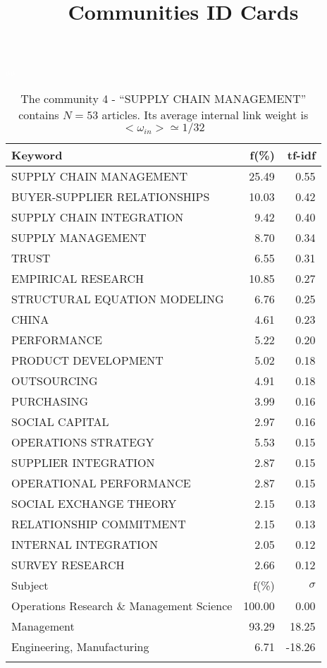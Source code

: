 \documentclass[a4paper,11pt]{report}
\title{{\bf Communities ID Cards}}
\date{\begin{flushleft}This document gather the ``ID Cards'' of the CC communities found within your database.\\
 The CC network was built by keeping a link between articles sharing at least 5 references. The communities characterized here correspond to the ones found in the level 1 (in the sense of the Louvain algo) which gathers more than 0 articles.\\
 These ID cards displays the most frequent keywords, subject categories, journals of publication, institution, countries, authors, references and reference journals of the articles of each community. The significance of an item $\sigma = \sqrt{N} (f - p) / \sqrt{p(1-p)}$ [where $N$ is the number of articles within the community and $f$ and $p$ are the proportion of articles respectively within the community and within the database displaying that item ] is also given (for example $\sigma > 5$ is really highly significant). The tf-idf value which can be calculated by $tf-idf = f*log(frac{1}{p})$ is also given.\\
\vspace{1cm}
\copyright Sebastian Grauwin, Liu Weizhi - (2014) \end{flushleft}}
\begin{document}
\begin{landscape}
\maketitle
\clearpage

\begin{table}[!ht]
\caption{The community 4 - ``SUPPLY CHAIN MANAGEMENT'' contains $N = 53$ articles. Its average internal link weight is $<\omega_{in}> \simeq 1/32$ }
\textcolor{white}{aa}\\
{\scriptsize\begin{tabular}{|l r  r|}
\hline
Keyword & f(\%) & tf-idf \\
\hline
SUPPLY CHAIN MANAGEMENT & 25.49 & 0.55\\
BUYER-SUPPLIER RELATIONSHIPS & 10.03 & 0.42\\
SUPPLY CHAIN INTEGRATION & 9.42 & 0.40\\
SUPPLY MANAGEMENT & 8.70 & 0.34\\
TRUST & 6.55 & 0.31\\
EMPIRICAL RESEARCH & 10.85 & 0.27\\
STRUCTURAL EQUATION MODELING & 6.76 & 0.25\\
CHINA & 4.61 & 0.23\\
PERFORMANCE & 5.22 & 0.20\\
PRODUCT DEVELOPMENT & 5.02 & 0.18\\
OUTSOURCING & 4.91 & 0.18\\
PURCHASING & 3.99 & 0.16\\
SOCIAL CAPITAL & 2.97 & 0.16\\
OPERATIONS STRATEGY & 5.53 & 0.15\\
SUPPLIER INTEGRATION & 2.87 & 0.15\\
OPERATIONAL PERFORMANCE & 2.87 & 0.15\\
SOCIAL EXCHANGE THEORY & 2.15 & 0.13\\
RELATIONSHIP COMMITMENT & 2.15 & 0.13\\
INTERNAL INTEGRATION & 2.05 & 0.12\\
SURVEY RESEARCH & 2.66 & 0.12\\
\hline
\hline
Subject & f(\%) & $\sigma$\\
\hline
Operations Research \& Management Science & 100.00 & 0.00\\
Management & 93.29 & 18.25\\
Engineering, Manufacturing & 6.71 & -18.26\\
 &  & \\

\end{tabular}}
\end{table}
\end{landscape}
\end{document}

